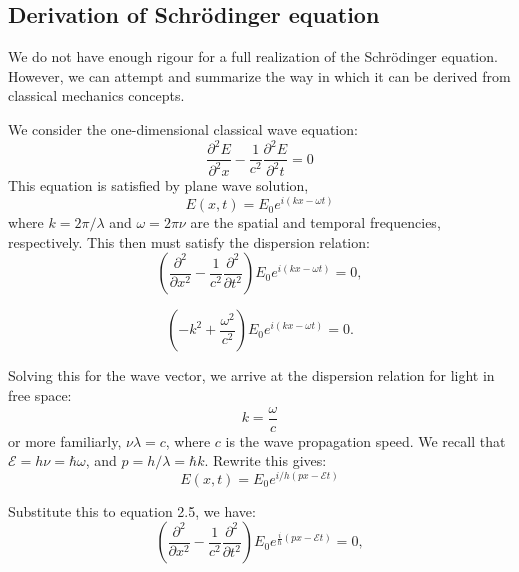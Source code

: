\subsection{Derivation of Schrödinger equation}
We do not have enough rigour for a full realization of the Schrödinger equation. However, we can attempt and summarize the way in which it can be derived from classical mechanics concepts. 

We consider the one-dimensional classical wave equation: \begin{equation}
    \frac{\partial^{2}E}{\partial^{2}x} - \frac{1}{c^{2}} \frac{\partial^{2}E}{\partial^{2}t} = 0
\end{equation}
This equation is satisfied by plane wave solution, \begin{equation}
    E(x,t) = E_{0}e^{i(kx-\omega t)}
\end{equation}
where $k=2\pi/\lambda$ and $\omega = 2\pi \nu$ are the spatial and temporal frequencies, respectively. This then must satisfy the dispersion relation: 
\begin{equation}
    \left( \frac{\partial^2}{\partial x^2} - \frac{1}{c^2} \frac{\partial^2}{\partial t^2} \right) E_0 e^{i(kx - \omega t)} = 0,
    \end{equation}
    
    \begin{equation}
    \left( -k^2 + \frac{\omega^2}{c^2} \right) E_0 e^{i(kx - \omega t)} = 0.
    \end{equation}

Solving this for the wave vector, we arrive at the dispersion relation for light in free space: \begin{equation}
    k=\frac{\omega}{c}
\end{equation}
or more familiarly, $\nu\lambda = c$, where $c$ is the wave propagation speed. We recall that $\mathcal{E}=h\nu=\hbar\omega$, and $p=h/\lambda=\hbar k$. Rewrite this gives: $$E(x,t)=E_{0}e^{i/h (px-\mathcal{E}t)}$$

Substitute this to equation 2.5, we have: 
\begin{equation}
    \left( \frac{\partial^2}{\partial x^2} - \frac{1}{c^2} \frac{\partial^2}{\partial t^2} \right) E_0 e^{\frac{i}{\hbar} (px - \mathcal{E} t)} = 0,
\end{equation}
    
